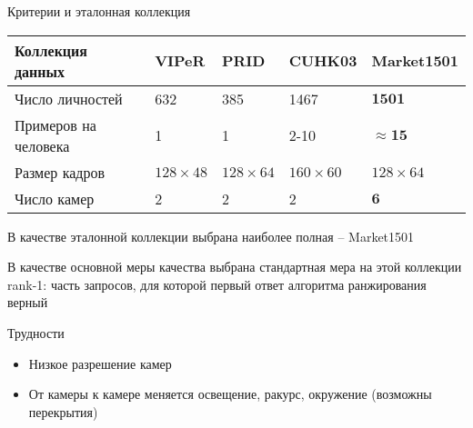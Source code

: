 \documentclass[14pt,mathserif,aspectratio=43]{beamer}
\begin{document}
\begin{frame}[label=etalon_collection]{Критерии и эталонная коллекция}

    \small
    
    \begin{tabular}{ p{2.5cm} | p{1.5cm} p{1.5cm} p{1.5cm} p{1.5cm} } 
        Коллекция данных & VIPeR & PRID & CUHK03 & Market1501 \\
        \hline
        Число личностей & 632 & 385 & 1467 & $\mathbf{1501}$ \\
        Примеров на человека & 1 & 1 & 2-10 & $\mathbf{\approx 15}$ \\
        Размер кадров & $128\times48$ & $128\times64$ & $160\times60$ & $128\times64$ \\
        Число камер & 2 & 2 & 2 & $\mathbf{6}$ \\
    \end{tabular}
    
    \bigskip

    В качестве эталонной коллекции выбрана наиболее полная -- Market1501
    
    \smallskip
    
    В качестве основной меры качества выбрана стандартная мера на этой коллекции rank-1: часть запросов, для которой первый ответ алгоритма ранжирования верный 
    
    \hyperlink{market1501_benchmark}{}
    
\end{frame}

\begin{frame}[label=hard_things]{Трудности}

    \begin{itemize}
        \item Низкое разрешение камер
        \item От камеры к камере меняется освещение, ракурс, окружение (возможны перекрытия)
    \end{itemize}
    
    \hyperlink{reason}{}
    
\end{frame}
\end{document}
